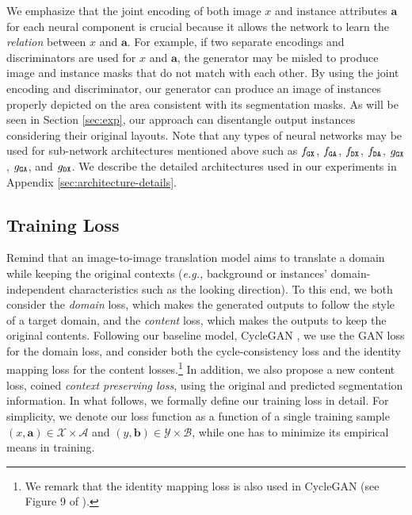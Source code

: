 \documentclass{article} \usepackage{iclr2019_conference,times}
\begin{document}
We emphasize that the joint encoding of both image $x$ and instance attributes $\bm{a}$ 
for each neural component is crucial because 
it allows the network to learn the \textit{relation} between $x$ and $\bm{a}$.
For example, if two separate encodings and discriminators are used for $x$ and $\bm{a}$,
the generator may be misled to produce image and instance masks that do not match with each other.
By using the joint encoding and discriminator, our generator can produce an image of
instances properly depicted on the area consistent with its segmentation masks.
As will be seen in Section \ref{sec:exp}, our approach can disentangle output instances considering their original layouts.
Note that any types of neural networks may be used for sub-network architectures mentioned above such as $f_{\tt GX}$, $f_{\tt GA}$, $f_{\tt DX}$, $f_{\tt DA}$, $g_{\tt GX}$, $g_{\tt GA}$, and $g_{\tt DX}$.
We describe the detailed architectures used in our experiments in Appendix \ref{sec:architecture-details}.



\vspace{-0.025in}
\subsection{Training Loss}
\label{sec:method-loss}
\vspace{-0.025in}

Remind that an image-to-image translation model aims to translate a domain
while keeping the original contexts (\textit{e.g.,} background or instances' domain-independent characteristics such as the looking direction).
To this end, we both consider the \textit{domain} loss, which makes the generated outputs to follow the style of a target domain,
and the \textit{content} loss, which makes the outputs to keep the original contents.
Following our baseline model, CycleGAN \citep{zhu2017unpaired},
we use the GAN loss for the domain loss, and consider both the cycle-consistency loss \citep{kim2017learning, yi2017dualgan}
and the identity mapping loss \citep{taigman2016unsupervised} for the content losses.\footnote{
We remark that the identity mapping loss is also used in CycleGAN (see Figure 9 of \citet{zhu2017unpaired}).
}
In addition, we also propose a new content loss, coined \textit{context preserving loss},
using the original and predicted segmentation information.
In what follows, we formally define our training loss in detail. For simplicity, we denote our loss function as a function of a single training sample
$(x, \bm{a}) \in \mathcal{X} \times \mathcal{A}$ and $(y, \bm{b}) \in \mathcal{Y} \times \mathcal{B}$,
while one has to minimize its empirical means in training.
\end{document}
